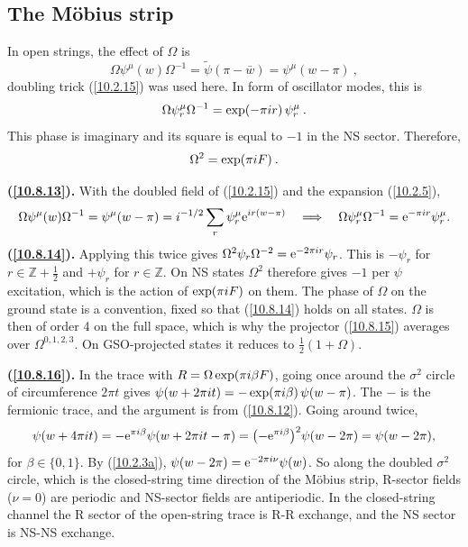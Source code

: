 	
	\subsection*{The M\"{o}bius strip}
	
	In open strings, the effect of $\Omega$ is
	\begin{equation}
		\Omega\psi^{\mu}(w)\Omega^{-1} =\tilde{\psi}(\pi-\bar{w})=\psi^{\mu}(w-\pi) \:,\label{10.8.12}
	\end{equation}
	doubling trick (\ref{10.2.15}) was used here. In form of oscillator modes, this is
	\begin{equation}
		\Omega \psi^{\mu}_{r} \Omega^{-1} =\exp(-\pi i r) \,\psi_{r}^{\mu} \:. \label{10.8.13}
	\end{equation}
	This phase is imaginary and its square is equal to $-1$ in the NS sector. Therefore,
	\begin{equation}
		\Omega^{2} =\exp(\pi i F) \:. \label{10.8.14}
	\end{equation}
	\begin{tcolorbox}[breakable]
		\begin{remark}
			\textbf{(\ref{10.8.13}).} With the doubled field of (\ref{10.2.15}) and the expansion (\ref{10.2.5}),
			\begin{equation*}
				\Omega\psi^\mu(w)\Omega^{-1}=\psi^\mu(w-\pi)=i^{-1/2}\sum_r\psi^\mu_r\mathrm{e}^{i r(w-\pi)}
				\quad\Longrightarrow\quad \Omega\psi^\mu_r\Omega^{-1}=\mathrm{e}^{-\pi i r}\psi^\mu_r .
			\end{equation*}
			\textbf{(\ref{10.8.14}).} Applying this twice gives $\Omega^{2}\psi_r\Omega^{-2}=\mathrm{e}^{-2\pi i r}\psi_r$. This is $-\psi_r$ for $r\in\mathds Z+\tfrac12$ and $+\psi_r$ for $r\in\mathds Z$. On NS states $\Omega^{2}$ therefore gives $-1$ per $\psi$ excitation, which is the action of $\exp(\pi i F)$ on them. The phase of $\Omega$ on the ground state is a convention, fixed so that (\ref{10.8.14}) holds on all states. $\Omega$ is then of order 4 on the full space, which is why the projector (\ref{10.8.15}) averages over $\Omega^{0,1,2,3}$. On GSO-projected states it reduces to $\tfrac12(1+\Omega)$.

			\textbf{(\ref{10.8.16}).} In the trace with $R=\Omega\exp(\pi i\beta F)$, going once around the $\sigma^{2}$ circle of circumference $2\pi t$ gives $\psi(w+2\pi i t)=-\exp(\pi i\beta)\,\psi(w-\pi)$. The $-$ is the fermionic trace, and the argument is from (\ref{10.8.12}). Going around twice,
			\begin{equation*}
				\psi(w+4\pi i t)=-\mathrm{e}^{\pi i\beta}\psi(w+2\pi i t-\pi)=\bigl(-\mathrm{e}^{\pi i\beta}\bigr)^{2}\psi(w-2\pi)=\psi(w-2\pi),
			\end{equation*}
			for $\beta\in\{0,1\}$. By (\ref{10.2.3a}), $\psi(w-2\pi)=\mathrm{e}^{-2\pi i\nu}\psi(w)$. So along the doubled $\sigma^{2}$ circle, which is the closed-string time direction of the M\"obius strip, R-sector fields ($\nu=0$) are periodic and NS-sector fields are antiperiodic. In the closed-string channel the R sector of the open-string trace is R-R exchange, and the NS sector is NS-NS exchange.
		\end{remark}
	\end{tcolorbox}
